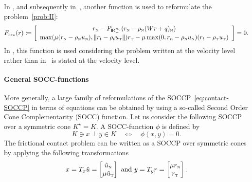 {In \citep{Stadler_SIOPT2004,Hueber.ea_SJSC2008}, and subsequently in~\citep{Koziara.Bicanic_CMAME2008}, another function is used to reformulate the problem~\ref{prob:II}:
\begin{equation}
  \label{eq:HSW-II}
    F_{\hswtwo}(r) \coloneqq \left[ \begin{array}{c}
    r_\n - P_{\RR^{n_c}_+}(r_\n - \rho_\n (W r +  q)_\n) \\
    \max(\mu(r_\n-\rho_\n u_\n),\|r_t-\rho_tu_\t\|)r_\t - \mu \max(0,r_n-\rho_\n u_\n)(r_t-\rho_\t u_\t)
  \end{array}\right] =0.
\end{equation}
In \citep{Hueber.ea_SJSC2008}, this function is used considering the problem written at the velocity level rather than in~\citep{Koziara.Bicanic_CMAME2008} is stated at the velocity level.







\paragraph{General SOCC-functions}

More generally, a large family of reformulations of the SOCCP~\eqref{eq:contact-SOCCP} in terms of equations can be obtained by using a so-called Second Order Cone Complementarity (SOCC) function. Let us consider the following SOCCP over a symmetric cone $K^\star = K $. A SOCC-function $\phi$ is defined by
\begin{equation}
  \label{eq:SOCC-function}
  K \ni x \perp y \in K \quad\Longleftrightarrow\quad \phi(x,y)=0.
\end{equation}
The frictional contact problem can be written as a SOCCP over symmetric cones by applying the following transformations
\begin{equation}
  \label{eq:SOCC-function1}
  x = T_x \hat u =
  \begin{bmatrix}
    \hat u_\n \\
    \mu \hat u_{\t}
  \end{bmatrix}
  \text{ and }  y =T_y r =
  \begin{bmatrix}
    \mu r_\n \\
    r_\t
  \end{bmatrix}.
\end{equation}

}
